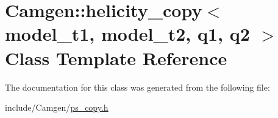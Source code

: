 \hypertarget{a00266}{}\section{Camgen\+:\+:helicity\+\_\+copy$<$ model\+\_\+t1, model\+\_\+t2, q1, q2 $>$ Class Template Reference}
\label{a00266}


The documentation for this class was generated from the following file\+:\begin{DoxyCompactItemize}
\item 
include/\+Camgen/\hyperlink{a00740}{ps\+\_\+copy.\+h}\end{DoxyCompactItemize}
